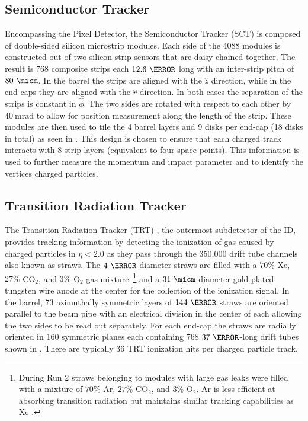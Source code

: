 \subsection{Semiconductor Tracker}

Encompassing the Pixel Detector, the Semiconductor Tracker (SCT)
\cite{PERF-2007-01} is composed of double-sided silicon microstrip modules.
Each side of the 4088 modules is constructed out of two silicon strip sensors
that are daisy-chained together.  The result is 768 composite strips each
$12.6~\cm$ long with an inter-strip pitch of $80~\micm$. In the barrel the
strips are aligned with the $\hat{z}$ direction, while in the end-caps they are
aligned with the $\hat{r}$ direction. In both cases the separation of the
strips is constant in $\hat{\phi}$. The two sides are rotated with respect to
each other by $40~\text{mrad}$ to allow for position measurement along the
length of the strip.  These modules are then used to tile the 4 barrel layers
and 9 disks per end-cap (18 disks in total) as seen in
.  This design is chosen to ensure that each
charged track interacts with 8 strip layers (equivalent to four space points).
This information is used to further measure the momentum and impact parameter
and to identify the vertices charged particles.

\subsection{Transition Radiation Tracker}

The Transition Radiation Tracker (TRT) \cite{PERF-2007-01}, the outermost
subdetector of the ID, provides tracking information by detecting the
ionization of gas caused by charged particles in $\eta < 2.0$ as they pass
through the 350,000 drift tube channels also known as straws.  The $4~\mm$
diameter straws are filled with a $70\%$ Xe, $27\%$ CO$_2$, and $3\%$ O$_2$ gas
mixture~\footnote{During Run 2 straws belonging to modules with large gas leaks
were filled with a mixture of $70\%$ Ar, $27\%$ CO$_2$, and $3\%$ O$_2$.  Ar is
less efficient at absorbing transition radiation but maintains similar tracking
capabilities as Xe \cite{Aaboud:2017odu}.} and a $31~\micm$ diameter
gold-plated tungsten wire anode at the center for the collection of the
ionization signal.  In the barrel, 73 azimuthally symmetric layers of $144~\cm$
straws are oriented parallel to the beam pipe with an electrical division in
the center of each allowing the two sides to be read out separately.  For each
end-cap the straws are radially oriented in 160 symmetric planes each containing
768 $37~\cm$-long drift tubes shown in .
There are typically 36 TRT ionization hits per charged particle track. 

